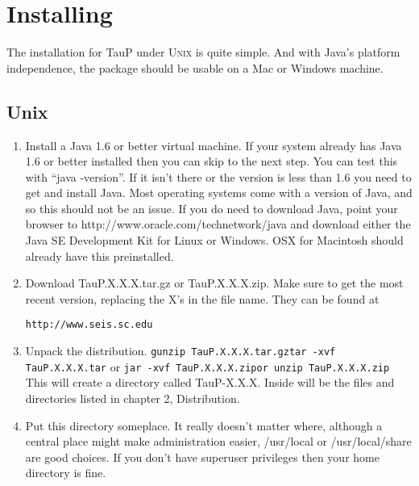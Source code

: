 
\section{Installing}
\label{install}

The installation for TauP under \textsc{Unix} is quite simple. And with Java's 
platform independence, the package should be usable on a Mac or Windows
machine.

\subsection{Unix}

\begin{enumerate}
\item Install a Java 1.6 or better virtual machine. If your system already has Java 1.6
or better installed then you can skip to the next step. You can test this
with ``java -version''. If it isn't there or the version is less than 1.6
you need to get and install Java. Most operating systems come with a version 
of Java, and so this should not be an issue. If you do need to download Java, 
point
your browser to http://www.oracle.com/technetwork/java and download either
the Java SE Development Kit for Linux or Windows. OSX for Macintosh should already have this preinstalled.

\item Download TauP.X.X.X.tar.gz or TauP.X.X.X.zip. Make sure to get the most recent version, replacing the X's  in the file name. They can be found at

\texttt{http://www.seis.sc.edu}

\item Unpack the distribution.
\texttt{\newline gunzip TauP.X.X.X.tar.gz\newline tar -xvf TauP.X.X.X.tar\newline}
or
\texttt{\newline jar -xvf TauP.X.X.X.zip\newline or unzip TauP.X.X.X.zip}
This will create a directory called TauP-X.X.X. Inside
will be the files and directories listed in chapter 2, Distribution.

\item Put this directory someplace. It really doesn't matter where, although
a central place might make administration easier, /usr/local or 
/usr/local/share are good choices. If you don't have superuser privileges
then your home directory is fine. 


\end{enumerate}

